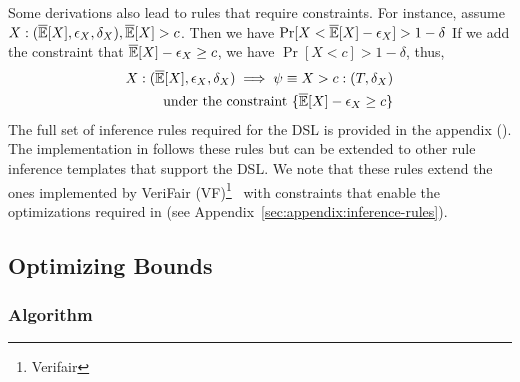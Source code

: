 Some derivations also lead to rules that require constraints.
For instance, assume $X: (\overline{\mathbb{E}}[X], \epsilon_X, \delta_X), \overline{\mathbb{E}}[X] > c$. 
Then we have $\Pr[X < \overline{\mathbb{E}}[X] - \epsilon_X] > 1 - \delta$
If we add the constraint that $\overline{\mathbb{E}}[X] - \epsilon_X \geq c$, we have $\Pr[X < c] > 1 - \delta$, thus, 
\begin{align*}
    X: (\overline{\mathbb{E}}[X], \epsilon_X, \delta_X) \implies \psi \equiv X > c: (T, \delta_X) \\
    \text{under the constraint } \{ \overline{\mathbb{E}}[X] - \epsilon_X \geq c\}
\end{align*}
The full set of inference rules required for the DSL is provided in the appendix ().
The implementation in \AVOIRmethodname{} follows these rules but can be extended to other rule inference templates that support the DSL.
We note that these rules extend the ones implemented by VeriFair (VF)\footnote{Verifair}~\citep{bastani2019probabilistic} with constraints that enable the optimizations required in \AVOIRmethodname{} (see Appendix~\ref{sec:appendix:inference-rules}). 





\subsection{Optimizing Bounds}
\label{sec:theoretical:optimization}


\subsubsection{\AVOIRmethodname{} Algorithm}

